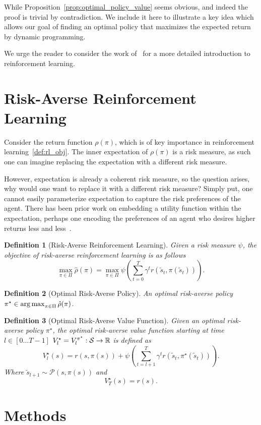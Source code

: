 \documentclass[10pt]{article}
\newtheorem{definition}{Definition}
\renewcommand{\cite}{\citep}
\theoremstyle{plain}
\theoremstyle{remark}
\begin{document}
While Proposition~\ref{prop:optimal_policy_value} seems obvious, and indeed the proof is trivial by contradiction. We include it here to illustrate a key idea which allows our goal of finding an optimal policy that maximizes the expected return by dynamic programming.

We urge the reader to consider the work of~\cite{sutton2018} for a more detailed introduction to reinforcement learning.

\section{Risk-Averse Reinforcement Learning}

Consider the return function $\rho(\pi)$, which is of key importance in reinforcement learning~\ref{def:rl_obj}. 
The inner expectation of $\rho(\pi)$ is a risk measure, as such one can imagine replacing the expectation
with a different risk measure.

However, expectation is already a coherent risk measure, so the question arises, why would one want to replace it with a different risk measure?
Simply put, one cannot easily parameterize expectation to capture the risk preferences of the agent. There has been
prior work on embedding a utility function within the expectation, perhaps one encoding the preferences of an agent who
desires higher returns less and less~\cite{howard1972}.

\begin{definition}[Risk-Averse Reinforcement Learning]\label{def:risk_averse_rl}
        Given a risk measure $\psi$, the objective of risk-averse reinforcement learning is as follows
        \[
        \max_{\pi \in \Pi} \hat{\rho}(\pi) = \max_{\pi \in \Pi} \psi \left( \sum_{t=0}^{T} \gamma^t r(\tilde{s}_t, \pi(\tilde{s}_t)) \right).
        \]
\end{definition}

\begin{definition}[Optimal Risk-Averse Policy]\label{def:optimal_risk_averse_policy}
        An optimal risk-averse policy $\pi^\star \in \operatorname*{arg\,max}_{\pi \in \Pi} \hat{\rho}(\pi)$.
\end{definition}

\begin{definition}[Optimal Risk-Averse Value Function]\label{def:optimal_risk_averse_value_function}
        Given an optimal risk-averse policy $\pi^\star$, the optimal risk-averse value function starting at time $l \in [0\ldots T-1]$ $V^\star_l = V^{\pi^\star}_l : \mathcal{S} \to \mathbb{R}$ is defined as
        \[
          V^\star_l(s) = r(s,\pi(s)) + \psi \left( \sum_{t=l+1}^{T} \gamma^t r(\tilde{s}_t, \pi^\star(\tilde{s}_t)) \right).
        \]
        Where $\tilde{s}_{l+1} \sim \mathcal{P}(s, \pi(s))$ and
        \[
          V^\star_T(s) = r(s).
        \]
\end{definition}




\section{Methods}


\end{document}
